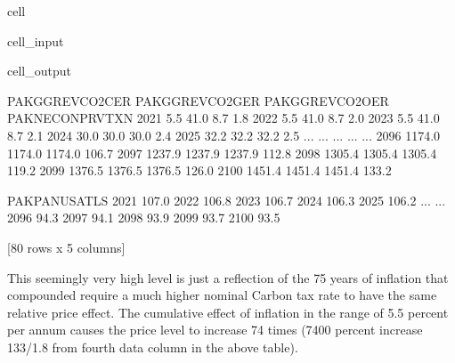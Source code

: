 \documentclass[letterpaper,10pt,english]{jupyterBook}
\begin{document}
\begin{sphinxuseclass}{cell}\begin{sphinxVerbatimInput}

\begin{sphinxuseclass}{cell_input}
\begin{sphinxVerbatim}[commandchars=\\\{\}]
\PYG{p}{[}\PYG{p}{]}
\end{sphinxVerbatim}

\end{sphinxuseclass}\end{sphinxVerbatimInput}
\begin{sphinxVerbatimOutput}

\begin{sphinxuseclass}{cell_output}
\begin{sphinxVerbatim}[commandchars=\\\{\}]
      PAKGGREVCO2CER  PAKGGREVCO2GER  PAKGGREVCO2OER  PAKNECONPRVTXN   
2021            \PYGZhy{}5.5           \PYGZhy{}41.0            \PYGZhy{}8.7             1.8  \PYGZbs{}
2022            \PYGZhy{}5.5           \PYGZhy{}41.0            \PYGZhy{}8.7             2.0   
2023            \PYGZhy{}5.5           \PYGZhy{}41.0            \PYGZhy{}8.7             2.1   
2024            30.0            30.0            30.0             2.4   
2025            32.2            32.2            32.2             2.5   
...              ...             ...             ...             ...   
2096          1174.0          1174.0          1174.0           106.7   
2097          1237.9          1237.9          1237.9           112.8   
2098          1305.4          1305.4          1305.4           119.2   
2099          1376.5          1376.5          1376.5           126.0   
2100          1451.4          1451.4          1451.4           133.2   

      PAKPANUSATLS  
2021         107.0  
2022         106.8  
2023         106.7  
2024         106.3  
2025         106.2  
...            ...  
2096          94.3  
2097          94.1  
2098          93.9  
2099          93.7  
2100          93.5  

[80 rows x 5 columns]
\end{sphinxVerbatim}

\end{sphinxuseclass}\end{sphinxVerbatimOutput}

\end{sphinxuseclass}
\sphinxAtStartPar
This seemingly very high level is just a reflection of the 75 years of inflation that compounded require a much higher nominal Carbon tax rate to have the same relative price effect. The cumulative effect of inflation in the range of 5.5 percent per annum causes the price level to increase 74 times (7400 percent increase  133/1.8 from fourth data column in the above table).
\end{document}
